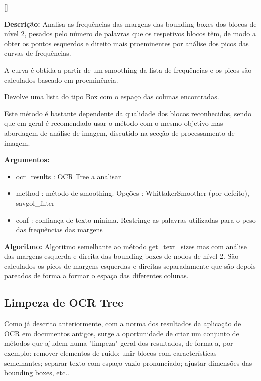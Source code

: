 [\normalsize]

\textbf{Descrição:} Analisa as frequências das margens das bounding boxes dos blocos de nível 2, pesados pelo número de palavras que os respetivos blocos têm, de modo a obter os pontos esquerdos e direito mais proeminentes por análise dos picos das curvas de frequências.

A curva é obtida a partir de um smoothing da lista de frequências e os picos são calculados baseado em proeminência.

Devolve uma lista do tipo Box com o espaço das colunas encontradas.

Este método é bastante dependente da qualidade dos blocos reconhecidos, sendo que em geral é recomendado usar o método com o mesmo objetivo mas abordagem de análise de imagem, discutido na secção de processamento de imagem.

\textbf{Argumentos:}
\begin{itemize}\setlength\itemsep{-0.3em}
	\item ocr\_results : OCR Tree a analisar
	\item method : método de smoothing. Opções : WhittakerSmoother (por defeito), savgol\_filter
	\item conf : confiança de texto mínima. Restringe as palavras utilizadas para o peso das frequências das margens
\end{itemize}

\textbf{Algoritmo:} Algoritmo semelhante ao método get\_text\_sizes mas com análise das margens esquerda e direita das bounding boxes de nodos de nível 2. São calculados os picos de margens esquerdas e direitas separadamente que são depois pareados de forma a formar o espaço das diferentes colunas.





\subsection{Limpeza de OCR Tree}
\label{contribution_clean_ocr}

Como já descrito anteriormente, com a norma dos resultados da aplicação de OCR em documentos antigos, surge a oportunidade de criar um conjunto de métodos que ajudem numa "limpeza" geral dos resultados, de forma a, por exemplo: remover elementos de ruído; unir blocos com características semelhantes; separar texto com espaço vazio pronunciado; ajustar dimensões das bounding boxes, etc..


